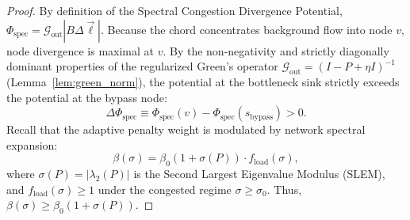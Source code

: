 \documentclass[11pt,a4paper]{article}
\begin{document}
\begin{proof}
By definition of the Spectral Congestion Divergence Potential, $\Phi_{\text{spec}} = \mathcal{G}_{\text{out}} |B \Delta \vec{\ell}|$. Because the chord concentrates background flow into node $v$, node divergence is maximal at $v$. By the non-negativity and strictly diagonally dominant properties of the regularized Green's operator $\mathcal{G}_{\text{out}} = (I - P + \eta I)^{-1}$ (Lemma~\ref{lem:green_norm}), the potential at the bottleneck sink strictly exceeds the potential at the bypass node:
\begin{equation}
\Delta \Phi_{\text{spec}} \equiv \Phi_{\text{spec}}(v) - \Phi_{\text{spec}}(s_{\text{bypass}}) > 0.
\end{equation}
Recall that the adaptive penalty weight is modulated by network spectral expansion:
\begin{equation}
\beta(\sigma) = \beta_0 (1 + \sigma(P)) \cdot f_{\text{load}}(\sigma),
\end{equation}
where $\sigma(P) = |\lambda_2(P)|$ is the Second Largest Eigenvalue Modulus (SLEM), and $f_{\text{load}}(\sigma) \ge 1$ under the congested regime $\sigma \ge \sigma_0$. Thus, $\beta(\sigma) \ge \beta_0 (1 + \sigma(P))$.


\end{proof}
\end{document}
